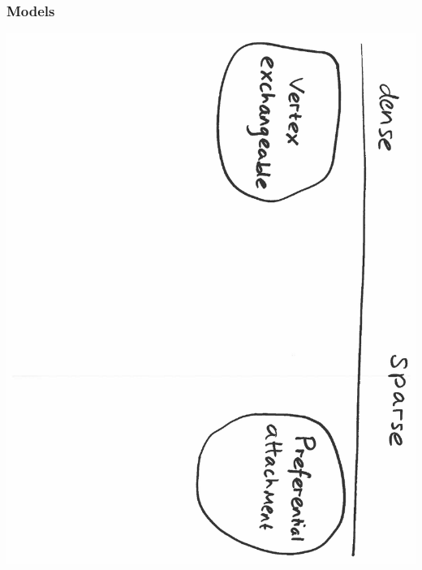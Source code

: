 \documentclass[final,hyperref={pdfpagelabels=false},noamsthm]{beamer}
\begin{document}
\begin{frame}
	\frametitle{Models}
	\includegraphics[angle=90,origin=c,scale=0.4]{fig/models3}
\end{frame}
\end{document}
